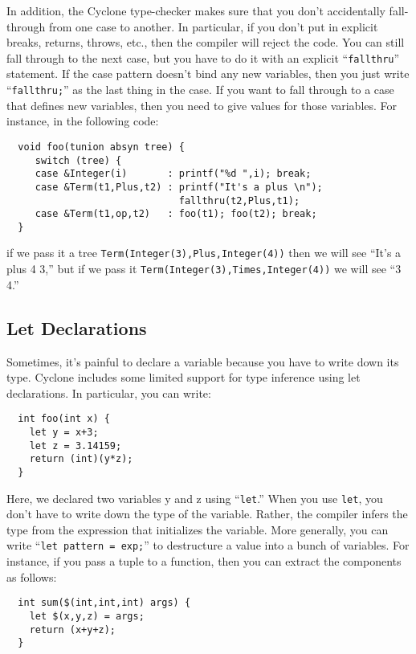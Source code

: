 In addition, the Cyclone type-checker makes sure that you don't
accidentally fall-through from one case to another.  In particular, if
you don't put in explicit breaks, returns, throws, etc., then the
compiler will reject the code.  You can still fall through to the next
case, but you have to do it with an explicit ``\texttt{fallthru}''
statement.  If the case pattern doesn't bind any new variables, then
you just write ``\texttt{fallthru;}'' as the last thing in the case.  If
you want to fall through to a case that defines new variables, then
you need to give values for those variables.  For instance, in the
following code:
\begin{verbatim}
  void foo(tunion absyn tree) {
     switch (tree) {
     case &Integer(i)       : printf("%d ",i); break;
     case &Term(t1,Plus,t2) : printf("It's a plus \n");
                              fallthru(t2,Plus,t1);
     case &Term(t1,op,t2)   : foo(t1); foo(t2); break;
  }
\end{verbatim}
if we pass it a tree \texttt{Term(Integer(3),Plus,Integer(4))} then we
will see ``It's a plus 4 3,'' but if we pass it
\texttt{Term(Integer(3),Times,Integer(4))} we will see ``3 4.''

\subsection{Let Declarations}
Sometimes, it's painful to declare a variable because you have to
write down its type.  Cyclone includes some limited support for type
inference using let declarations.  In particular, you can write:
\begin{verbatim}
  int foo(int x) {
    let y = x+3;
    let z = 3.14159;
    return (int)(y*z);
  }
\end{verbatim}

Here, we declared two variables y and z using ``\texttt{let}.''  When
you use \texttt{let}, you don't have to write down the type of the
variable.  Rather, the compiler infers the type from the expression
that initializes the variable.  More generally, you can write
``\texttt{let pattern = exp;}'' to destructure a value into a bunch of
variables.  For instance, if you pass a tuple to a function, then you
can extract the components as follows:
\begin{verbatim}
  int sum($(int,int,int) args) {
    let $(x,y,z) = args;
    return (x+y+z);
  }
\end{verbatim}


